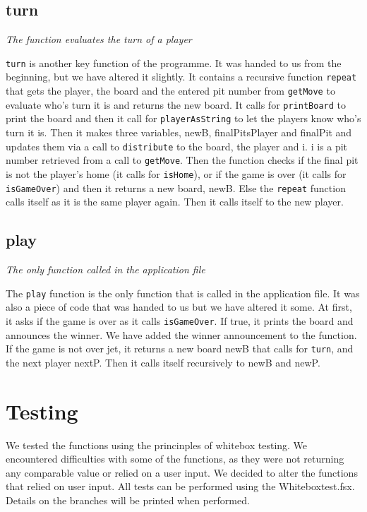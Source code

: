 \documentclass[a4paper]{report}
\begin{document}
\subsection*{turn}
{\it The function evaluates the turn of a player}

\texttt{turn} is another key function of the programme. It was handed  to us from the beginning, but we have altered it slightly. It contains a recursive function \texttt{repeat} that gets the player, the board and the entered 	pit number from \texttt{getMove} to evaluate who's turn it is and returns the new board. It calls for \texttt{printBoard} to print the board and then it call for \texttt{playerAsString} to let the players know who's turn it is.
Then it makes three variables, newB, finalPitsPlayer and finalPit and updates them via a call to \texttt{distribute} to the board, the player and i. i is a pit number retrieved from a call to \texttt{getMove}.
Then the function checks if the final pit is not the player's home (it calls for \texttt{isHome}), or if the game is over (it calls for \texttt{isGameOver}) and then it returns a new board, newB. Else the \texttt{repeat} function calls itself as it is the same player again. Then it calls itself to the new player.

\subsection*{play}
{\it The only function called in the application file}

The \texttt{play} function is the only function that is called in the application file. It was also a piece of code that was handed to us but we have altered it some.
At first, it asks if the game is over as it calls \texttt{isGameOver}. If true, it prints the board and announces the winner. We have added the winner announcement to the function. If the game is not over jet, it returns a new board newB that calls for \texttt{turn}, and the next player nextP. Then it calls itself recursively to newB and newP.
\\
\section*{Testing}
We tested the functions using the princinples of whitebox testing. We encountered difficulties with some of the functions, as they were not returning any comparable value or relied on a user input.
We decided to alter the functions that relied on user input. All tests can be performed using the Whiteboxtest.fsx. Details on the branches will be printed when performed.
\end{document}
